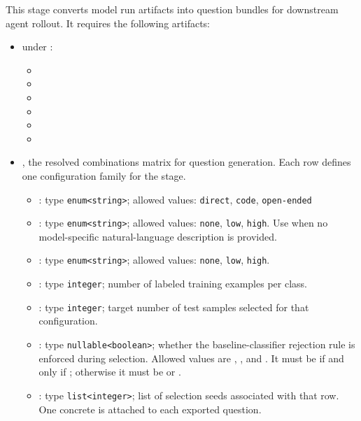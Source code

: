 \documentclass[11pt]{article}
\begin{document}
\label{docstart:generate_question_stage}
This stage converts model run artifacts into \name{} question bundles for downstream agent rollout.
It requires the following artifacts:
\begin{itemize}
  \item under :
  \begin{itemize}
    \item {}
    \item {}
    \item {}
    \item {}
    \item {}
    \item {} 
  \end{itemize}
  \item {}, the resolved combinations matrix for question generation. Each row defines one configuration family for the stage.
  \begin{itemize}
    \item {}: type \texttt{enum<string>}; allowed values: \texttt{direct}, \texttt{code}, \texttt{open-ended}
    \item \termDescLevel: type \texttt{enum<string>}; allowed values: \texttt{none}, \texttt{low}, \texttt{high}. Use  when no model-specific natural-language description is provided.
    \item {}: type \texttt{enum<string>}; allowed values: \texttt{none}, \texttt{low}, \texttt{high}.
    \item {}: type \texttt{integer}; number of labeled training examples per class.
    \item {}: type \texttt{integer}; target number of test samples selected for that configuration.
    \item {}: type \texttt{nullable<boolean>}; whether the baseline-classifier rejection rule is enforced during selection. 
    Allowed values are , , and . 
    It must be  if and only if ; otherwise it must be  or .
    \item {}: type \texttt{list<integer>}; list of selection seeds associated with that row. One concrete  is attached to each exported question.

\end{itemize}
\end{itemize}
\end{document}

